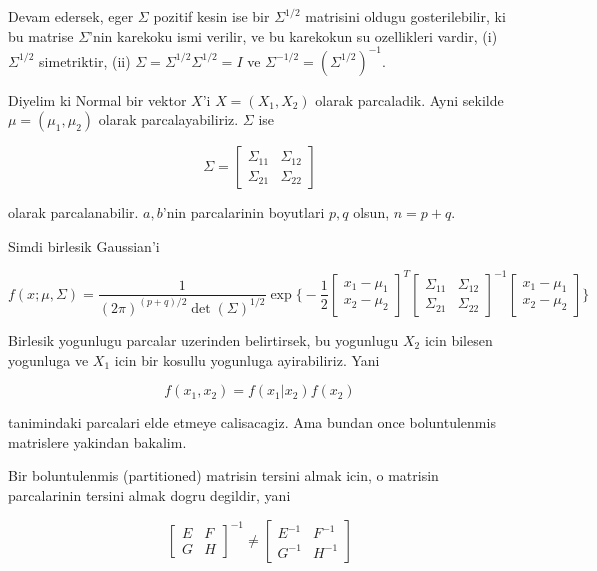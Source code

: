 \documentclass[12pt,fleqn]{article}\usepackage{../common}
\begin{document}
Devam edersek, eger $\Sigma$ pozitif kesin ise bir $\Sigma^{1/2}$ matrisini
oldugu gosterilebilir, ki bu matrise $\Sigma$'nin karekoku ismi verilir, ve
bu karekokun su ozellikleri vardir, (i)  $\Sigma^{1/2}$ simetriktir, (ii)
$\Sigma =  \Sigma^{1/2}\Sigma^{1/2} = I$ ve $\Sigma^{-1/2} =
(\Sigma^{1/2})^{-1}$. 

Diyelim ki Normal bir vektor $X$'i $X = (X_1,X_2)$ olarak parcaladik. Ayni
sekilde $\mu = (\mu_1,\mu_2)$ olarak parcalayabiliriz. $\Sigma$ ise

\[ \Sigma = 
\left[\begin{array}{rr}
\Sigma_{11} & \Sigma_{12}\\
\Sigma_{21} & \Sigma_{22}
\end{array}\right]
 \]

olarak parcalanabilir. $a,b$'nin parcalarinin boyutlari $p,q$ olsun, $n =
p+q$.

Simdi birlesik Gaussian'i 

\[ f(x;\mu,\Sigma) = 
\frac{ 1}{(2\pi)^{(p+q)/2} \det(\Sigma)^{1/2}} 
\exp 
\bigg\{ 
-\frac{ 1}{2}
\left[\begin{array}{r}
x_1 - \mu_1\\
x_2 - \mu_2
\end{array}\right]^T
\left[\begin{array}{rr}
\Sigma_{11} & \Sigma_{12}\\
\Sigma_{21} & \Sigma_{22}
\end{array}\right]^{-1}
\left[\begin{array}{r}
x_1 - \mu_1\\
x_2 - \mu_2
\end{array}\right]
\bigg\}
 \]

Birlesik yogunlugu parcalar uzerinden belirtirsek, bu yogunlugu $X_2$ icin
bilesen yogunluga ve $X_1$ icin bir kosullu yogunluga ayirabiliriz. Yani 

\[ f(x_1,x_2) = f(x_1|x_2) f(x_2) \]

tanimindaki parcalari elde etmeye calisacagiz.  Ama bundan once
boluntulenmis matrislere yakindan bakalim. 

Bir boluntulenmis (partitioned) matrisin tersini almak icin, o matrisin
parcalarinin tersini almak dogru degildir, yani

\[ 
\left[\begin{array}{rr}
E & F \\
G & H
\end{array}\right] ^{-1} \ne
\left[\begin{array}{rr}
E^{-1} & F ^{-1}\\
G^{-1} & H^{-1}
\end{array}\right]  
 \]
\end{document}
